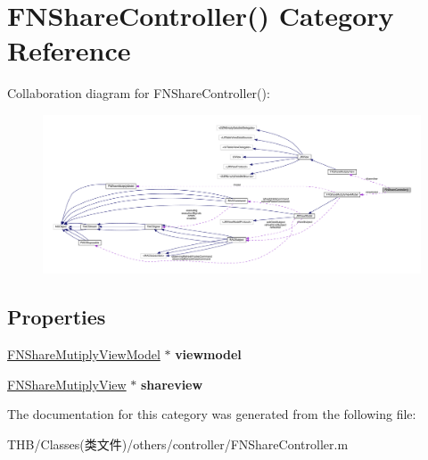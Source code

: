 \hypertarget{category_f_n_share_controller_07_08}{}\section{F\+N\+Share\+Controller() Category Reference}
\label{category_f_n_share_controller_07_08}


Collaboration diagram for F\+N\+Share\+Controller()\+:\nopagebreak
\begin{figure}[H]
\begin{center}
\leavevmode
\includegraphics[width=350pt]{category_f_n_share_controller_07_08__coll__graph}
\end{center}
\end{figure}
\subsection*{Properties}
\begin{DoxyCompactItemize}
\item 
\mbox{\label{category_f_n_share_controller_07_08_a3dbfb65b2a5df2f1b3014ef4a0607da8}} 
\mbox{\hyperlink{interface_f_n_share_mutiply_view_model}{F\+N\+Share\+Mutiply\+View\+Model}} $\ast$ {\bfseries viewmodel}
\item 
\mbox{\label{category_f_n_share_controller_07_08_a5309ccc446511cbebda711ae54a05554}} 
\mbox{\hyperlink{interface_f_n_share_mutiply_view}{F\+N\+Share\+Mutiply\+View}} $\ast$ {\bfseries shareview}
\end{DoxyCompactItemize}


The documentation for this category was generated from the following file\+:\begin{DoxyCompactItemize}
\item 
T\+H\+B/\+Classes(类文件)/others/controller/F\+N\+Share\+Controller.\+m\end{DoxyCompactItemize}
